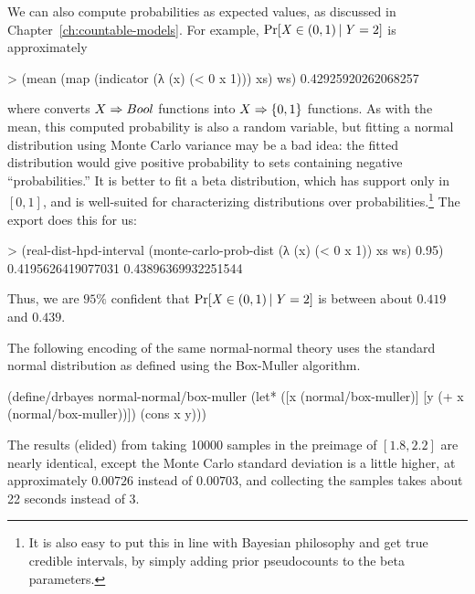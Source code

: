 We can also compute probabilities as expected values, as discussed in Chapter~\ref{ch:countable-models}.
For example, $\mathrm{Pr}\!\left[{\mathit{X} \in (0,1) \,|\, \mathit{Y} = 2}\right]$ is approximately
\begin{center}\singlespacing
\begin{schemedisplay}
> (mean (map (indicator (λ (x) (< 0 x 1))) xs) ws)
0.42925920262068257
\end{schemedisplay}
\end{center}
where  converts $X \Rightarrow Bool$ functions into $X \Rightarrow \{{0,1}\}$ functions.
As with the mean, this computed probability is also a random variable, but fitting a normal distribution using Monte Carlo variance may be a bad idea: the fitted distribution would give positive probability to sets containing negative ``probabilities.''
It is better to fit a beta distribution, which has support only in $[0,1]$, and is well-suited for characterizing distributions over probabilities.\footnote{It is also easy to put this in line with Bayesian philosophy and get true credible intervals, by simply adding prior pseudocounts to the beta parameters.}
The  export  does this for us:
\begin{center}\singlespacing
\begin{schemedisplay}
> (real-dist-hpd-interval
   (monte-carlo-prob-dist (λ (x) (< 0 x 1)) xs ws)
   0.95)
0.4195626419077031
0.43896369932251544
\end{schemedisplay}
\end{center}
Thus, we are $95\%$ confident that $\mathrm{Pr}\!\left[{\mathit{X} \in (0,1) \,|\, \mathit{Y} = 2}\right]$ is between about $0.419$ and $0.439$.

The following encoding of the same normal-normal theory uses the standard normal distribution as defined using the Box-Muller algorithm.
\begin{center}\singlespacing
\begin{schemedisplay}
(define/drbayes normal-normal/box-muller
  (let* ([x  (normal/box-muller)]
         [y  (+ x (normal/box-muller))])
    (cons x y)))
\end{schemedisplay}
\end{center}
The results (elided) from taking 10000 samples in the preimage of $[1.8,2.2]$ are nearly identical, except the Monte Carlo standard deviation is a little higher, at approximately $0.00726$ instead of $0.00703$, and collecting the samples takes about 22 seconds instead of 3.

